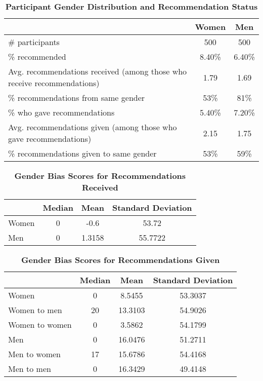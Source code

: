 \documentclass[12pt]{caltech_thesis}
\begin{document}
\begin{table}[htbp]
   \centering
   \caption{\textbf{Participant Gender Distribution and Recommendation Status}}
   \label{Table 2}
   \renewcommand{\arraystretch}{1.5}
   \begin{tabular}{@{}l c c@{}}
     \toprule
     & \textbf{Women} & \textbf{Men} \\
     \midrule
     \# participants & 500 & 500 \\
     \% recommended & 8.40\% & 6.40\% \\
     \quad Avg. recommendations received (among those who receive recommendations) & 1.79 & 1.69 \\
     \quad \% recommendations from same gender & 53\% & 81\% \\
     \% who gave recommendations & 5.40\% & 7.20\% \\
     \quad Avg. recommendations given (among those who gave recommendations) & 2.15 & 1.75 \\
     \quad \% recommendations given to same gender & 53\% & 59\% \\
     \bottomrule
   \end{tabular}%
   \label{tab:recommendation}%
 \end{table}%
 \restoregeometry

 \begin{table}[htbp]
   \centering
   \caption{\textbf{Gender Bias Scores for Recommendations Received}}
   \label{tab:gender_bias_received}
   \begin{tabular}{@{}lccc@{}}
       \toprule
       & Median & Mean & Standard Deviation \\
       \midrule
       Women & 0 & -0.6 & 53.72 \\
       Men & 0 & 1.3158 & 55.7722 \\
       \bottomrule
   \end{tabular}
\end{table}
\hfill
\hfill
\hfill
\hfill
\hfill
\begin{table}[htbp]
   \centering
   \caption{\textbf{Gender Bias Scores for Recommendations Given}}
   \label{tab:gender_bias_given}
   \begin{tabular}{@{}lccc@{}}
       \toprule
       & \textbf{Median} & \textbf{Mean} & \textbf{Standard Deviation} \\
       \midrule
       Women & 0 & 8.5455 & 53.3037 \\
       \quad Women to men & 20 & 13.3103 & 54.9026 \\
       \quad Women to women & 0 & 3.5862 & 54.1799 \\
       Men & 0 & 16.0476 & 51.2711 \\
       \quad Men to women & 17 & 15.6786 & 54.4168 \\
       \quad Men to men & 0 & 16.3429 & 49.4148 \\
       \bottomrule
   \end{tabular}
\end{table}
\end{document}
